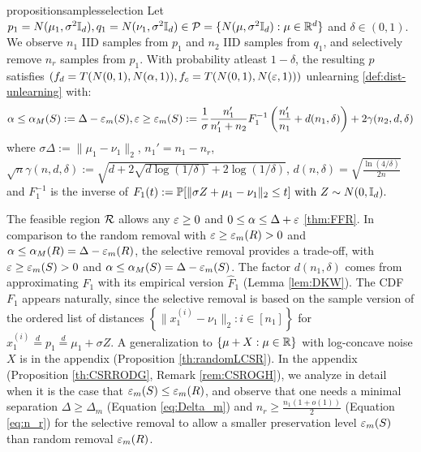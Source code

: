 \begin{restatable}{proposition}{samplesselection}
\label{th:selective}
Let $p_1=N(\mu_1, \sigma^2 \mathbb{I}_d), q_1= N(\nu_1, \sigma^2 \mathbb{I}_d) \in \mathcal{P}= \{N(\mu, \sigma^2\mathbb{I}_d): \mu \in \mathbb{R}^d\}$ and $\delta \in (0,1)$. We observe $n_1$ IID samples from $p_1$ and $n_2$ IID samples from $q_1$, and selectively remove $n_r$ samples from $p_1$. With probability atleast $1 - \delta$, the resulting $p$ satisfies $(f_d= T(N(0,1), N(\alpha, 1)),f_c= T(N(0,1), N(\varepsilon, 1)))$ unlearning \ref{def:dist-unlearning} with:
\begin{align*}
    \alpha
    \leq 
   \alpha_M(S):= \Delta - \varepsilon_m(S),
    \varepsilon
    \geq  
    \varepsilon_m(S):= 
    \frac{1}{\sigma}\frac{n_1'}{n_1' + n_2} 
    F_1^{-1}\left(\frac{n_1'}{n_1} +d(n_1, \delta)\right)
    + 
    2\gamma(n_2,d,\delta)
\end{align*}
where $\sigma \Delta := \|\mu_1- \nu_1\|_2$, $n_1'= n_1- n_r$, $\sqrt{n} \gamma(n, d, \delta):= \sqrt{d+2\sqrt{d \log (1/\delta)} + 2 \log (1/\delta)}$, $d(n,\delta)=\sqrt{\frac{\ln(4/\delta)}{2n}}$ and $F_1^{-1}$ is the inverse of $F_1(t):= \mathbb{P}[\|\sigma Z + \mu_1- \nu_1\|_2 \leq t] \text{ with } Z \sim N(0, \mathbb{I}_d).$ 
\end{restatable}
\begin{remark} \label{rem:ICGSR}
The feasible region $\mathcal{R}$ allows any $\varepsilon \geq 0$ and  $ 0\leq \alpha \leq \Delta +\varepsilon$ \ref{thm:FFR}. In comparison to the random removal with $\varepsilon \geq \varepsilon_m(R)>0$ and  $\alpha \leq \alpha_M(R)= \Delta  -\varepsilon_m(R)$, the selective removal provides a trade-off, with  $\varepsilon \geq \varepsilon_m(S)>0$ and  $\alpha \leq \alpha_M(S)=  \Delta -\varepsilon_m(S)$. The factor $d(n_1,\delta)$ comes from  approximating $F_1$ with its empirical version $\widehat{F}_1$ (Lemma \ref{lem:DKW}). The CDF $F_1$ appears naturally, since the selective removal is based on the sample version of the ordered list of distances   $\left\{\|x_1^{(i)} - \nu_1\|_2: i\in [n_1]\right\}$ for $x_1^{(i)} \overset{d}{=} p_1\overset{d}{=} \mu_1 + \sigma Z$. A generalization to  $\{\mu+X:\mu\in \mathbb{R}\}$ with log-concave noise $X$ is in the appendix (Proposition \ref{th:randomLCSR}). In the appendix (Proposition \ref{th:CSRRODG}, Remark \ref{rem:CSROGH}), we analyze in detail when it is the case that $\varepsilon_m(S)\leq \varepsilon_m(R)$, and observe that one needs a minimal separation $\Delta \geq \Delta_m$ (Equation \ref{eq:Delta_m}) and $n_r \geq \frac{n_1 (1+ o(1))}{2}$ (Equation \ref{eq:n_r}) for the selective removal to allow a smaller preservation level $\varepsilon_m(S)$ than random removal $\varepsilon_m(R)$.
\end{remark}
\vspace{-2 mm}



